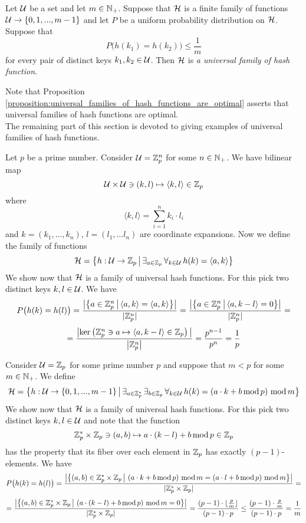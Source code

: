 \begin{definition}
Let ${\mathcal U}$ be a set and let $m\in {\mathbb N}_+$. Suppose that ${\mathcal H}$ is a finite family of functions ${\mathcal U}\rightarrow \{0,1,...,m-1\}$ and let $P$ be a uniform probability distribution on ${\mathcal H}$. Suppose that
$$P\big(h(k_1) = h(k_2)\big) \leq \frac{1}{m}$$
for every pair of distinct keys $k_1,k_2\in {\mathcal U}$. Then ${\mathcal H}$ is \textit{a universal family of hash function}. 
\end{definition}
\noindent
Note that Proposition \ref{proposition:universal_families_of_hash_functions_are_optimal} asserts that universal families of hash functions are optimal.\\
The remaining part of this section is devoted to giving examples of universal families of hash functions.

\begin{example}\label{example:inner_product_for_integers_modulo_p_family}
Let $p$ be a prime number. Consider ${\mathcal U} = {\mathbb Z}_p^n$ for some $n\in {\mathbb N}_+$. We have bilinear map
$${\mathcal U}\times {\mathcal U} \ni (k,l)\mapsto \langle k, l\rangle\in {\mathbb Z}_p$$
where
$$\langle k, l\rangle = \sum_{i=1}^{n}k_i\cdot l_i$$
and $k = (k_1,...,k_n)$, $l = (l_1,...l_n)$ are coordinate expansions. Now we define the family of functions
$${\mathcal H} = \big\{h:{\mathcal U}\rightarrow {\mathbb Z}_p\,\big|\,\exists_{a\in {\mathbb Z}_p}\,\forall_{k\in {\mathcal U}}\,h(k) = \langle a, k\rangle\big\}$$
We show now that ${\mathcal H}$ is a family of universal hash functions. For this pick two distinct keys $k,l\in {\mathcal U}$. We have
$$P\big(h(k) = h(l)\big) = \frac{\big|\big\{a\in {\mathbb Z}_p^n\,\big|\,\langle a, k\rangle = \langle a, k\rangle\big\}\big|}{|{\mathbb Z}_p^n|} = \frac{\big|\big\{a\in {\mathbb Z}_p^n\,\big|\,\langle a, k - l \rangle = 0\big\}\big|}{|{\mathbb Z}_p^n|} =$$
$$= \frac{\big|\mathrm{ker}\left({\mathbb Z}^n_p\ni a\mapsto \langle a, k-l\rangle\in {\mathbb Z}_p \right)\big|}{\big|{\mathbb Z}^n_p\big|} = \frac{p^{n-1}}{p^n} = \frac{1}{p}$$
\end{example}

\begin{example}\label{example:inner_product_for_integers_modulo_p_family}
Consider ${\mathcal U} = {\mathbb Z}_p$ for some prime number $p$ and suppose that $m < p$ for some $m\in {\mathbb N}_+$. We define
$${\mathcal H} = \big\{h:{\mathcal U}\rightarrow \{0,1,...,m-1\}\,\big|\,\exists_{a\in {\mathbb Z}_p^*}\,\exists_{b\in {\mathbb Z}_p}\,\forall_{k\in {\mathcal U}}\,h(k) = \left(a\cdot k + b\,\mathrm{mod}\,p\right)\,\mathrm{mod}\,m\big\}$$
We show now that ${\mathcal H}$ is a family of universal hash functions. For this pick two distinct keys $k,l\in {\mathcal U}$ and note that the function
$${\mathbb Z}_p^*\times {\mathbb Z}_p \ni (a,b) \mapsto a\cdot (k-l) + b\,\mathrm{mod}\,p\in {\mathbb Z}_p$$
has the property that its fiber over each element in ${\mathbb Z}_p$ has exactly $(p-1)$-elements. We have
$$P\big(h(k) = h(l)\big) = \frac{\big|\big\{(a,b)\in {\mathbb Z}_p^*\times {\mathbb Z}_p\,\big|\,\left(a\cdot k + b\,\mathrm{mod}\,p\right)\,\mathrm{mod}\,m = \left(a\cdot l + b\,\mathrm{mod}\,p\right)\,\mathrm{mod}\,m\big\}\big|}{|{\mathbb Z}_p^*\times {\mathbb Z}_p|} =$$
$$= \frac{\big|\big\{(a,b)\in {\mathbb Z}_p^*\times {\mathbb Z}_p\,\big|\,\left(a\cdot (k-l) + b\,\mathrm{mod}\,p\right)\,\mathrm{mod}\,m = 0\big\}\big|}{|{\mathbb Z}_p^*\times {\mathbb Z}_p|} = \frac{(p-1)\cdot \lfloor\frac{p}{m}\rfloor}{(p-1)\cdot p} \leq \frac{(p-1)\cdot \frac{p}{m}}{(p-1)\cdot p} = \frac{1}{m}$$
\end{example}

